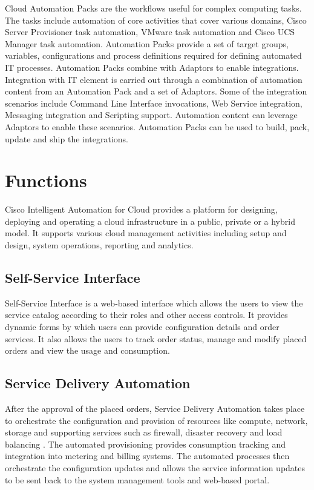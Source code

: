 \documentclass[9pt,twocolumn,twoside]{../../styles/osajnl}
\begin{document}
Cloud Automation Packs are the workflows useful for complex computing
tasks. The tasks include automation of core activities that cover
various domains, Cisco Server Provisioner task automation, VMware task
automation and Cisco UCS Manager task automation. Automation Packs
provide a set of target groups, variables, configurations and process
definitions required for defining automated IT processes. Automation
Packs combine with Adaptors to enable integrations. Integration with
IT element is carried out through a combination of automation content
from an Automation Pack and a set of Adaptors. Some of the integration
scenarios include Command Line Interface invocations, Web Service
integration, Messaging integration and Scripting support. Automation
content can leverage Adaptors to enable these scenarios. Automation
Packs can be used to build, pack, update and ship the integrations.

\section{Functions}

Cisco Intelligent Automation for Cloud provides a platform for
designing, deploying and operating a cloud infrastructure in a public,
private or a hybrid model. It supports various cloud management
activities including setup and design, system operations, reporting
and analytics.

\subsection{Self-Service Interface}

Self-Service Interface is a web-based interface which allows the users
to view the service catalog according to their roles and other access
controls. It provides dynamic forms by which users can provide
configuration details and order services. It also allows the users to
track order status, manage and modify placed orders and view the usage
and consumption.

\subsection{Service Delivery Automation}

After the approval of the placed orders, Service Delivery Automation
takes place to orchestrate the configuration and provision of
resources like compute, network, storage and supporting services such
as firewall, disaster recovery and load balancing
\cite{cisco-datasheet}. The automated provisioning provides
consumption tracking and integration into metering and billing
systems. The automated processes then orchestrate the configuration
updates and allows the service information updates to be sent back to
the system management tools and web-based portal.
\end{document}

